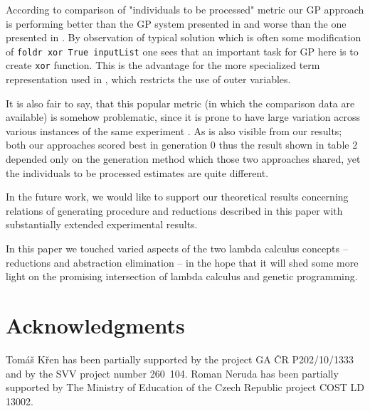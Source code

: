 \documentclass{sig-alternate}
\newcommand{\red}[1]{{\color{red} #1}}
\begin{document}
According to comparison of "individuals to be processed" metric our GP approach is performing better than the GP system presented in \cite{kes} and worse than the one presented in \cite{yu01}. By observation of typical solution which is often some modification of \texttt{foldr xor True inputList} one sees that an important task for GP here is to create \texttt{xor} function. This is the advantage for the more specialized term representation used in \cite{yu01}, which restricts the use of outer variables. 

It is also fair to say, that this popular metric (in which the comparison data are available) is somehow problematic, since it is prone to have large variation across various instances of the same experiment \cite{luke2002perfect}. As is also visible from our results; both our approaches scored best in generation 0 thus the result shown in table 2 depended only on the generation method which those two approaches shared, yet the individuals to be processed estimates are quite different.

In the future work, we would like to support our theoretical results concerning relations of generating procedure and reductions described in this paper with substantially extended experimental results.

In this paper we touched varied aspects of the two lambda calculus concepts -- reductions and abstraction elimination -- in the hope that it will shed some more light on the promising intersection of lambda calculus and genetic programming.






\section{Acknowledgments}

Tom\'{a}\v{s} K\v{r}en has been partially supported by the project GA \v{C}R P202/10/1333 and by the SVV project number 260~104. Roman Neruda has been partially supported by The Ministry of Education of the Czech Republic project COST LD 13002.


%
%


\end{document}
